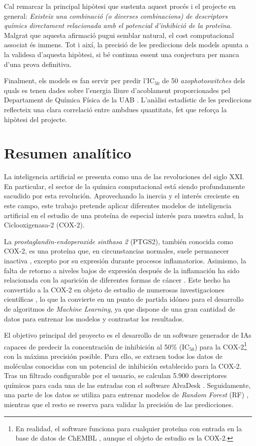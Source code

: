 \documentclass[11pt]{article}
\begin{document}
Cal remarcar la principal hipòtesi que sustenta aquest procés i el projecte en general: \emph{Existeix una combinació (o diverses combinacions) de descriptors químics directament relacionada amb el potencial d'inhibició de la proteïna}. Malgrat que aquesta afirmació pugui semblar natural, el cost computacional associat és immens. Tot i així, la precisió de les prediccions dels models apunta a la validesa d'aquesta hipòtesi, si bé continua essent una conjectura per manca d'una prova definitiva.

Finalment, els models es fan servir per predir l'IC$_{50}$ de 50 \emph{azophotoswitches} dels quals es tenen dades sobre l'energia lliure d'acoblament proporcionades pel Departament de Química Física de la UAB \cite{UAB_ComputationalChemistry}. L'anàlisi estadístic de les prediccions reflecteix una clara correlació entre ambdues quantitats, fet que reforça la hipòtesi del projecte.
\newpage

\section*{Resumen analítico}
La inteligencia artificial se presenta como una de las revoluciones del siglo XXI. En particular, el sector de la química computacional está siendo profundamente sacudido por esta revolución. Aprovechando la inercia y el interés creciente en este campo, este trabajo pretende aplicar diferentes modelos de inteligencia artificial en el estudio de una proteína de especial interés para nuestra salud, la Ciclooxigenasa-2 (COX-2).

La \emph{prostaglandin-endoperoxide sinthasa 2} (PTGS2), también conocida como COX-2, es una proteína que, en circunstancias normales, suele permanecer inactiva \cite{Cox2Location}, excepto por su expresión durante procesos inflamatorios. Asimismo, la falta de retorno a niveles bajos de expresión después de la inflamación ha sido relacionada con la aparición de diferentes formas de cáncer \cite{DefinitionCOX2CancerDictionary}. Este hecho ha convertido a la COX-2 en objeto de estudio de numerosas investigaciones científicas \cite{Cox2InhibitorsReview}, lo que la convierte en un punto de partida idóneo para el desarrollo de algoritmos de \emph{Machine Learning}, ya que dispone de una gran cantidad de datos para entrenar los modelos y contrastar los resultados.

El objetivo principal del proyecto es el desarrollo de un software generador de IAs capaces de predecir la concentración de inhibición al 50\% (IC$_{50}$) para la COX-2\footnote{En realidad, el software funciona para cualquier proteína con entrada en la base de datos de ChEMBL \cite{ChemblDatabase}, aunque el objeto de estudio es la COX-2.} con la máxima precisión posible. Para ello, se extraen todos los datos de moléculas conocidas con un potencial de inhibición establecido para la COX-2. Tras un filtrado configurable por el usuario, se calculan 5.900 descriptores químicos para cada una de las entradas con el software AlvaDesk \cite{MauriMolecularDescriptorsBook}\cite{AlvaDescSecondPaper}. Seguidamente, una parte de los datos se utiliza para entrenar modelos de \emph{Random Forest} (RF) \cite{MachineLearningRandomForest}, mientras que el resto se reserva para validar la precisión de las predicciones.
\end{document}
